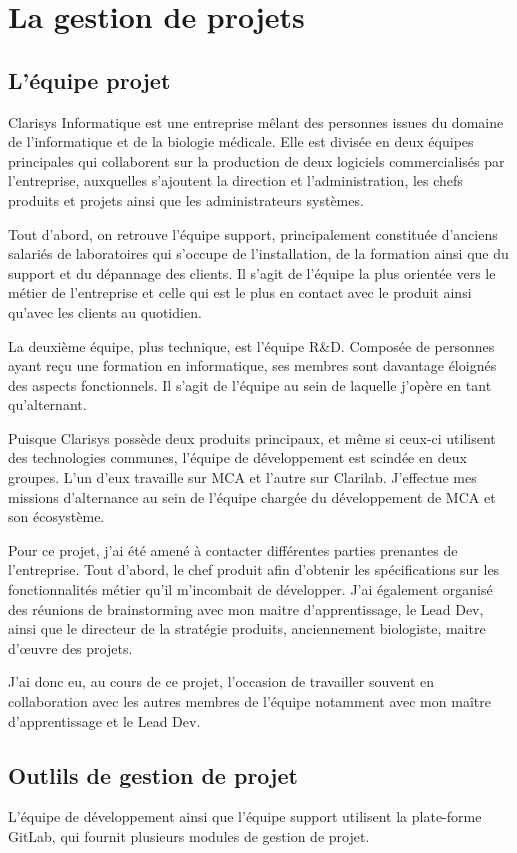 \chapter{La gestion de projets}
\section{L'équipe projet}
Clarisys Informatique est une entreprise mêlant des personnes issues du domaine de 
l’informatique et de la biologie médicale. Elle est divisée en deux équipes principales 
qui collaborent sur la production de deux logiciels commercialisés par l’entreprise, 
auxquelles s’ajoutent la direction et l’administration, les chefs produits et projets 
ainsi que les administrateurs systèmes.

Tout d’abord, on retrouve l’équipe support, principalement constituée d’anciens 
salariés de laboratoires qui s’occupe de l’installation, de la formation ainsi 
que du support et du dépannage des clients. Il s’agit de l’équipe la plus orientée 
vers le métier de l’entreprise et celle qui est le plus en contact avec le produit 
ainsi qu’avec les clients au quotidien.

La deuxième équipe, plus technique, est l’équipe R\&D. Composée de personnes ayant 
reçu une formation en informatique, ses membres sont davantage éloignés des aspects 
fonctionnels. Il s’agit de l’équipe au sein de laquelle j’opère en tant qu’alternant.

Puisque Clarisys possède deux produits principaux, et même si ceux-ci utilisent des 
technologies communes, l’équipe de développement est scindée en deux groupes. L’un d’eux 
travaille sur MCA et l’autre sur Clarilab. J’effectue mes missions d’alternance au sein 
de l’équipe chargée du développement de MCA et son écosystème.

Pour ce projet, j’ai été amené à contacter différentes parties prenantes de l’entreprise. 
Tout d’abord, le chef produit afin d’obtenir les spécifications sur les fonctionnalités 
métier qu’il m’incombait de développer. J’ai également organisé des réunions de 
brainstorming avec mon maitre d’apprentissage, le Lead Dev, ainsi que le directeur de 
la stratégie produits, anciennement biologiste, maitre d’œuvre des projets.

J’ai donc eu, au cours de ce projet, l’occasion de travailler souvent en collaboration 
avec les autres membres de l’équipe notamment avec mon maître d’apprentissage et le 
Lead Dev.
\pagebreak
\section{Outlils de gestion de projet}
L’équipe de développement ainsi que l’équipe support utilisent la plate-forme GitLab, qui fournit plusieurs modules de gestion de projet. 

